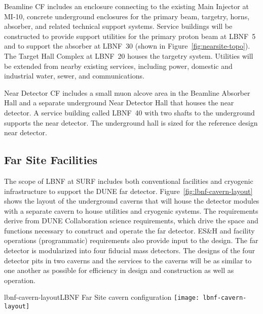 Beamline CF includes an enclosure connecting to the existing Main Injector at MI-10, concrete underground enclosures for the primary beam, targetry, horns, absorber, and related technical support systems. Service buildings will be constructed to provide support utilities for the primary proton beam at LBNF~5 and to support the absorber at LBNF~30 (shown in Figure~\ref{fig:nearsite-topo}).  The Target Hall Complex at LBNF~20 houses the targetry system.  Utilities will be extended from nearby existing services, including power, domestic and industrial water, sewer, and communications. 
 
Near Detector CF includes a small muon alcove area in the Beamline Absorber Hall and a separate underground Near Detector Hall that houses the near detector. A service building called LBNF~40 with two shafts to the underground supports the near detector. The underground hall is sized for the reference design near detector.
 
\subsection{Far Site Facilities}
 
The scope of LBNF at SURF includes both conventional facilities and cryogenic infrastructure to support the DUNE far detector. Figure~\ref{fig:lbnf-cavern-layout} shows the layout of the underground caverns that will house the detector modules with a separate cavern to house utilities and cryogenic systems. The requirements derive from DUNE Collaboration science requirements, which drive the space and functions necessary to construct and operate the far detector.  ES\&H and facility operations (programmatic) requirements also provide input to the design. The far detector is modularized into four  fiducial mass detectors. The designs of the four detector pits in two caverns and the services to the caverns will be as similar to one another as possible for efficiency in design and construction as well as operation. 
 
\begin{cdrfigure}{lbnf-cavern-layout}{LBNF Far Site cavern configuration}  
\texttt{[image: lbnf-cavern-layout]}
\end{cdrfigure}
 
